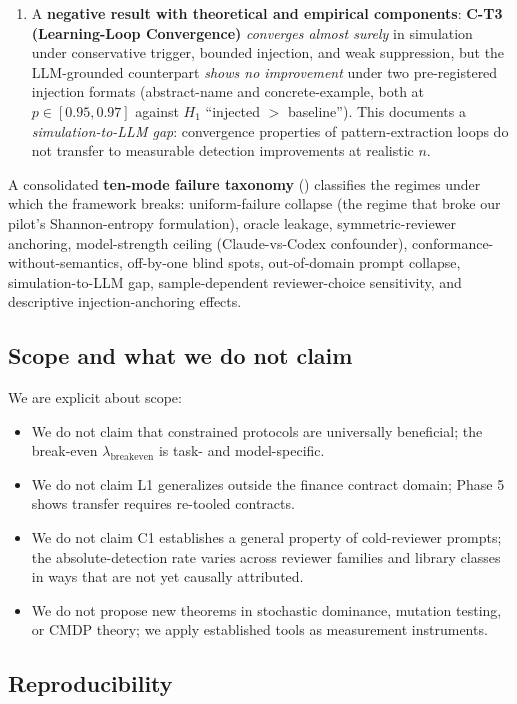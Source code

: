 \begin{enumerate}[leftmargin=2em]
\item A \textbf{negative result with theoretical and empirical components}: \textbf{C-T3 (Learning-Loop Convergence)} \emph{converges almost surely} in simulation under conservative trigger, bounded injection, and weak suppression, but the LLM-grounded counterpart \emph{shows no improvement} under two pre-registered injection formats (abstract-name and concrete-example, both at $p \in [0.95, 0.97]$ against $H_1$ ``injected $>$ baseline''). This documents a \emph{simulation-to-LLM gap}: convergence properties of pattern-extraction loops do not transfer to measurable detection improvements at realistic $n$.
\end{enumerate}

A consolidated \textbf{ten-mode failure taxonomy} () classifies the regimes under which the framework breaks: uniform-failure collapse (the regime that broke our pilot's Shannon-entropy formulation), oracle leakage, symmetric-reviewer anchoring, model-strength ceiling (Claude-vs-Codex confounder), conformance-without-semantics, off-by-one blind spots, out-of-domain prompt collapse, simulation-to-LLM gap, sample-dependent reviewer-choice sensitivity, and descriptive injection-anchoring effects.

\subsection{Scope and what we do not claim}

We are explicit about scope:
\begin{itemize}[leftmargin=2em]
\item We do not claim that constrained protocols are universally beneficial; the break-even $\lambda_{\mathrm{breakeven}}$ is task- and model-specific.
\item We do not claim L1 generalizes outside the finance contract domain; Phase 5 shows transfer requires re-tooled contracts.
\item We do not claim C1 establishes a general property of cold-reviewer prompts; the absolute-detection rate varies across reviewer families and library classes in ways that are not yet causally attributed.
\item We do not propose new theorems in stochastic dominance, mutation testing, or CMDP theory; we apply established tools as measurement instruments.
\end{itemize}

\subsection{Reproducibility}


